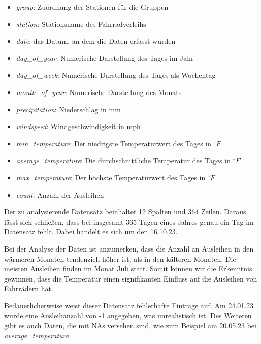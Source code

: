 \documentclass[a4paper, 12pt]{article}
\begin{document}
\begin{itemize}
    \item \textit{group}: Zuordnung der Stationen für die Gruppen
    \item \textit{station}: Stationsname des Fahrradverleihs
    \item \textit{date}: das Datum, an dem die Daten erfasst wurden 
    \item \textit{day\_of\_year}: Numerische Darstellung des Tages im Jahr
    \item \textit{day\_of\_week}: Numerische Darstellung des Tages als Wochentag
    \item \textit{month\_of\_year}: Numerische Darstellung des Monats
    \item \textit{precipitation}: Niederschlag in mm
    \item \textit{windspeed}: Windgeschwindigkeit in mph
    \item \textit{min\_temperature}: Der niedrigste Temperaturwert des Tages in \(^\circ F \)
    \item \textit{average\_temperature}: Die durchschnittliche Temperatur des Tages 
    in \(^\circ F \)
    \item \textit{max\_temperature}: Der höchste Temperaturwert des Tages in \(^\circ F \)
    \item \textit{count}: Anzahl der Ausleihen
    
\vspace{\baselineskip}
    
\end{itemize}

Der zu analysierende Datensatz beinhaltet 12 Spalten und 364 Zeilen. Daraus lässt 
sich schließen, dass bei insgesamt 365 Tagen eines Jahres genau ein Tag im Datensatz fehlt. Dabei handelt es sich um den 16.10.23.

Bei der Analyse der Daten ist anzumerken, dass die Anzahl an Ausleihen in den 
wärmeren Monaten tendenziell höher ist, als in den kälteren Monaten. Die meisten 
Ausleihen finden im Monat Juli statt. Somit können wir die Erkenntnis gewinnen, 
dass die Temperatur einen signifikanten Einfluss auf die Ausleihen von Fahrrädern 
hat.

Bedauerlicherweise weist dieser Datensatz fehlerhafte Einträge auf. Am 24.01.23 
wurde eine Ausleihanzahl von -1 angegeben, was unrealistisch ist. 
Des Weiteren gibt es auch Daten, die mit NAs versehen sind, wie zum Beispiel am 
20.05.23 bei \textit{average\_temperature}.

\vspace{\baselineskip} 
\end{document}
